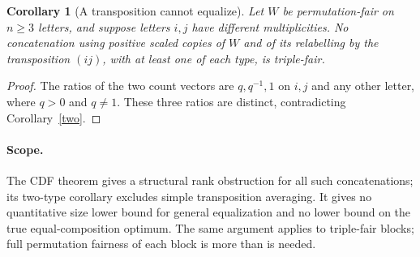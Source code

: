\documentclass[11pt]{article}
\newtheorem{corollary}[theorem]{Corollary}
\begin{document}
\begin{corollary}[A transposition cannot equalize]
Let $W$ be permutation-fair on $n\ge3$ letters, and suppose letters
$i,j$ have different multiplicities. No concatenation using positive
scaled copies of $W$ and of its relabelling by the transposition $(ij)$,
with at least one of each type, is triple-fair.
\end{corollary}
\begin{proof}
The ratios of the two count vectors are $q,q^{-1},1$ on $i,j$ and any
other letter, where $q>0$ and $q\ne1$. These three ratios are distinct,
contradicting Corollary~\ref{two}.
\end{proof}

\paragraph{Scope.}
The CDF theorem gives a structural rank obstruction for all such
concatenations; its two-type corollary excludes simple transposition
averaging. It gives no quantitative size lower bound for general
equalization and no lower bound on the true equal-composition optimum.
The same argument applies to triple-fair blocks; full permutation
fairness of each block is more than is needed.
\end{document}
